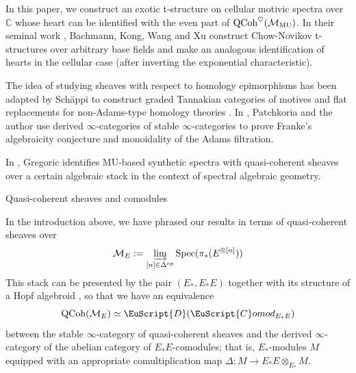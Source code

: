 \documentclass[oneside,a4paper]{amsart}
\makeatletter
\newcommand{\euscr}[1]{\EuScript{#1}} %
\newcommand{\dcat}{\euscr{D}} %
\newcommand{\QCoh}{\textnormal{QCoh}} %
\newcommand{\MU}{\mathrm{MU}} %
\newcommand{\Comod}{\euscr{C}omod} %
\newcommand{\ComodE}{\Comod_{E_{*}E}} %
\theoremstyle{plain}
\theoremstyle{definition}
\theoremstyle{remark}
\def\subsection{\@startsection{subsection}{1}%
  \z@{.7\linespacing\@plus\linespacing}{.5\linespacing}%
  {\normalfont\bfseries\centering}}%
\makeatother
\begin{document}
In this paper, we construct an exotic t-structure on cellular motivic spectra over $\mathbb{C}$ whose heart can be identified with the even part of $\QCoh^{\heartsuit}(\mathcal{M}_{\MU})$. In their seminal work \cite{bachmann2020chow}, Bachmann, Kong, Wang and Xu construct Chow-Novikov t-structures over arbitrary base fields and make an analogous identification of hearts in the cellular case (after inverting the exponential characteristic). 

The idea of studying sheaves with respect to homology epimorphisms has been adapted by Sch\"{a}ppi to construct graded Tannakian categories of motives and flat replacements for non-Adams-type homology theories \cite{schappi2020graded, schappi2020flat}. In \cite{patchkoria2021adams}, Patchkoria and the author use derived $\infty$-categories of stable $\infty$-categories to prove Franke's algebraicity conjecture and monoidality of the Adams filtration. 

In \cite{gregoric2021moduli}, Gregoric identifies $\MU$-based synthetic spectra with quasi-coherent sheaves over a certain algebraic stack in the context of spectral algebraic geometry. 

\subsection{Quasi-coherent sheaves and comodules} 
\label{subsection:qcoh_sheaves_and_comodules}

In the introduction above, we have phrased our results in terms of quasi-coherent sheaves over 
\[
\mathcal{M}_{E} := \varinjlim_{[n] \in \Delta^{op}} \textnormal{Spec}(\pi_{*}(E^{\otimes [n]}))
\]
This stack can be presented by the pair $(E_{*}, E_{*}E)$ together with its structure of a Hopf algebroid \cite{ravenel_complex_cobordism}, so that we have an equivalence 
\[
\QCoh(\mathcal{M}_{E}) \simeq \dcat(\ComodE)
\]
between the stable $\infty$-category of quasi-coherent sheaves and the derived $\infty$-category of the abelian category of $E_{*}E$-comodules; that is, $E_{*}$-modules $M$ equipped with an appropriate comultiplication map $\Delta\colon M \rightarrow E_{*}E \otimes_{E_{*}} M$.
\end{document}
